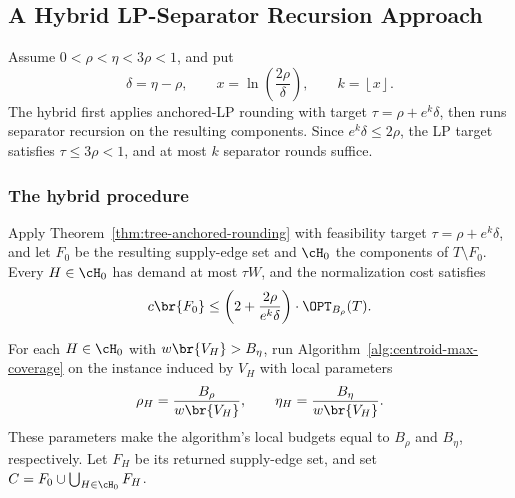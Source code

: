 \subsection{A Hybrid LP-Separator Recursion Approach}

Assume $0<\rho<\eta<3\rho<1$, and put
\[
    \delta=\eta-\rho,
    \qquad
    x=\ln\left(\frac{2\rho}{\delta}\right),
    \qquad
    k=\left\lfloor x\right\rfloor.
\]
The hybrid first applies anchored-LP rounding with target $\tau=\rho+e^k\delta$, then runs separator recursion on the resulting components. Since $e^k\delta\leq2\rho$, the LP target satisfies $\tau\leq3\rho<1$, and at most $k$ separator rounds suffice.

\subsubsection{The hybrid procedure}


Apply Theorem~\ref{thm:tree-anchored-rounding} with feasibility target $\tau=\rho+e^k\delta$, and let $F_0$ be the resulting supply-edge set and $\cH_0$ the components of $T\setminus F_0$. Every $H\in\cH_0$ has demand at most $\tau W$, and the normalization cost satisfies
\begin{equation}\label{eq:tree-hybrid-normalization-cost}
    c\br{F_0}
    \leq
    \left(2+\frac{2\rho}{e^k\delta}\right)\cdot\OPT_{B_\rho}(T).
\end{equation}

For each $H\in\cH_0$ with $w\br{V_H}>B_\eta$, run Algorithm~\ref{alg:centroid-max-coverage} on the instance induced by $V_H$ with local parameters
\[
    \rho_H=\frac{B_\rho}{w\br{V_H}},
    \qquad
    \eta_H=\frac{B_\eta}{w\br{V_H}}.
\]
These parameters make the algorithm's local budgets equal to $B_\rho$ and $B_\eta$, respectively. Let $F_H$ be its returned supply-edge set, and set $C=F_0\cup\bigcup_{H\in\cH_0}F_H$.

